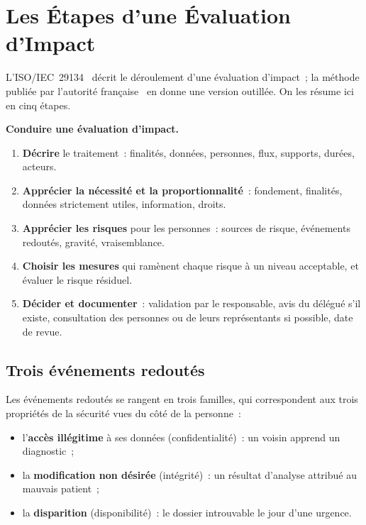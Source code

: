 \section{Les Étapes d'une Évaluation d'Impact}
\label{sec:c05-etapes}

L'ISO/IEC~29134~\cite{iso29134} décrit le déroulement d'une évaluation
d'impact~; la méthode publiée par l'autorité française~\cite{cnil2018pia}
en donne une version outillée. On les résume ici en cinq étapes.

\begin{boxprocedure}
\textbf{Conduire une évaluation d'impact.}
\begin{enumerate}
    \item \textbf{Décrire} le traitement~: finalités, données, personnes,
          flux, supports, durées, acteurs.
    \item \textbf{Apprécier la nécessité et la proportionnalité}~: fondement,
          finalités, données strictement utiles, information, droits.
    \item \textbf{Apprécier les risques} pour les personnes~: sources de
          risque, événements redoutés, gravité, vraisemblance.
    \item \textbf{Choisir les mesures} qui ramènent chaque risque à un niveau
          acceptable, et évaluer le risque résiduel.
    \item \textbf{Décider et documenter}~: validation par le responsable,
          avis du délégué s'il existe, consultation des personnes ou de
          leurs représentants si possible, date de revue.
\end{enumerate}
\end{boxprocedure}

\subsection{Trois événements redoutés}

Les événements redoutés se rangent en trois familles, qui correspondent aux
trois propriétés de la sécurité vues du côté de la personne~:
\begin{itemize}
    \item l'\textbf{accès illégitime} à ses données (confidentialité)~: un
          voisin apprend un diagnostic~;
    \item la \textbf{modification non désirée} (intégrité)~: un résultat
          d'analyse attribué au mauvais patient~;
    \item la \textbf{disparition} (disponibilité)~: le dossier introuvable le
          jour d'une urgence.
\end{itemize}

